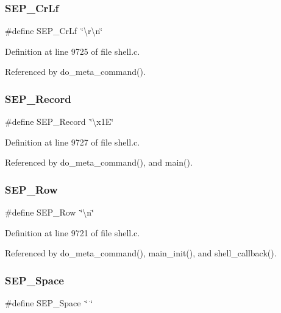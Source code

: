 \subsubsection{S\+E\+P\+\_\+\+Cr\+Lf}
{\footnotesize\ttfamily \#define S\+E\+P\+\_\+\+Cr\+Lf~\char`\"{}\textbackslash{}r\textbackslash{}n\char`\"{}}



Definition at line 9725 of file shell.\+c.



Referenced by do\+\_\+meta\+\_\+command().

\mbox{\label{shell_8c_a6f2ec1764d3ebd8e09b108e6c5ea63ad}} 
\subsubsection{S\+E\+P\+\_\+\+Record}
{\footnotesize\ttfamily \#define S\+E\+P\+\_\+\+Record~\char`\"{}\textbackslash{}x1E\char`\"{}}



Definition at line 9727 of file shell.\+c.



Referenced by do\+\_\+meta\+\_\+command(), and main().

\mbox{\label{shell_8c_a066c210a01388b50e6b104c2d5f03c8a}} 
\subsubsection{S\+E\+P\+\_\+\+Row}
{\footnotesize\ttfamily \#define S\+E\+P\+\_\+\+Row~\char`\"{}\textbackslash{}n\char`\"{}}



Definition at line 9721 of file shell.\+c.



Referenced by do\+\_\+meta\+\_\+command(), main\+\_\+init(), and shell\+\_\+callback().

\mbox{\label{shell_8c_acb5d341353dbb9653aeedbcf742171f6}} 
\subsubsection{S\+E\+P\+\_\+\+Space}
{\footnotesize\ttfamily \#define S\+E\+P\+\_\+\+Space~\char`\"{} \char`\"{}}



